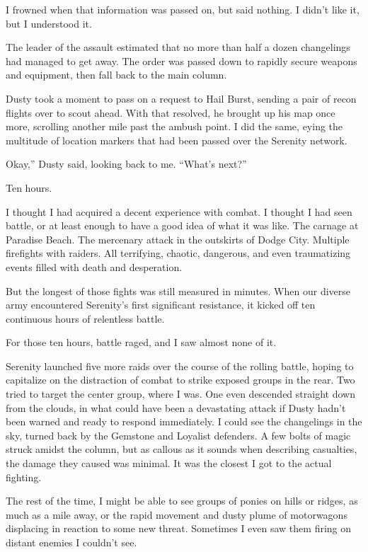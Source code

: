 I frowned when that information was passed on, but said nothing. I didn’t like it, but I understood it.

The leader of the assault estimated that no more than half a dozen changelings had managed to get away. The order was passed down to rapidly secure weapons and equipment, then fall back to the main column.

Dusty took a moment to pass on a request to Hail Burst, sending a pair of recon flights over to scout ahead. With that resolved, he brought up his map once more, scrolling another mile past the ambush point. I did the same, eying the multitude of location markers that had been passed over the Serenity network.

\leavevmode{}Okay,” Dusty said, looking back to me. “What’s next?”

{\br}%
Ten hours.

I thought I had acquired a decent experience with combat. I thought I had seen battle, or at least enough to have a good idea of what it was like. The carnage at Paradise Beach. The mercenary attack in the outskirts of Dodge City. Multiple firefights with raiders. All terrifying, chaotic, dangerous, and even traumatizing events filled with death and desperation.

But the longest of those fights was still measured in minutes. When our diverse army encountered Serenity’s first significant resistance, it kicked off ten continuous hours of relentless battle.

For those ten hours, battle raged, and I saw almost none of it.

Serenity launched five more raids over the course of the rolling battle, hoping to capitalize on the distraction of combat to strike exposed groups in the rear. Two tried to target the center group, where I was. One even descended straight down from the clouds, in what could have been a devastating attack if Dusty hadn’t been warned and ready to respond immediately. I could see the changelings in the sky, turned back by the Gemstone and Loyalist defenders. A few bolts of magic struck amidst the column, but as callous as it sounds when describing casualties, the damage they caused was minimal. It was the closest I got to the actual fighting.

The rest of the time, I might be able to see groups of ponies on hills or ridges, as much as a mile away, or the rapid movement and dusty plume of motorwagons displacing in reaction to some new threat. Sometimes I even saw them firing on distant enemies I couldn’t see.

